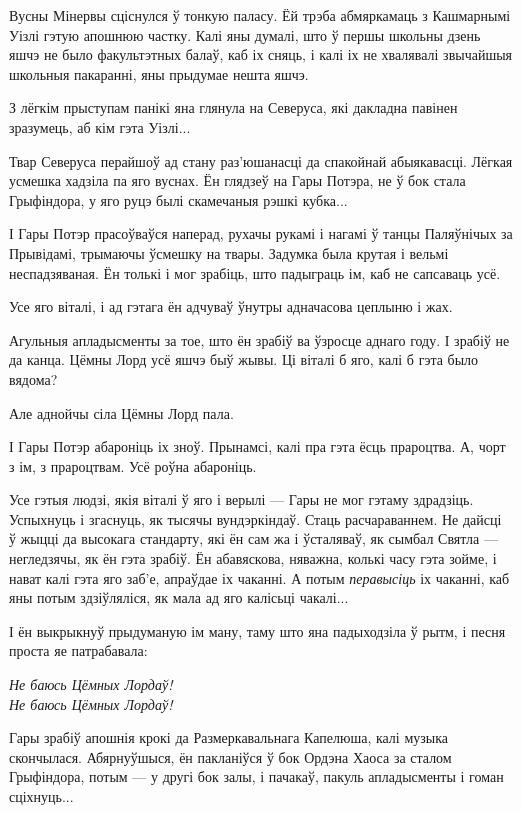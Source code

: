 Вусны Мінервы сціснулся ў тонкую паласу. Ёй трэба абмяркамаць з Кашмарнымі Уізлі
гэтую апошнюю частку. Калі яны думалі, што ў першы школьны дзень яшчэ не было 
факультэтных балаў, каб іх сняць, і калі іх не хвалявалі звычайшыя школьныя пакаранні,
яны прыдумае нешта яшчэ.

З лёгкім прыступам панікі яна глянула на Северуса, які дакладна павінен зразумець, аб кім гэта Уізлі...


Твар Северуса перайшоў ад стану раз'юшанасці да спакойнай абыякавасці. Лёгкая 
усмешка хадзіла па яго вуснах. Ён глядзеў на Гары Потэра, не ў бок стала Грыфіндора,
у яго руцэ былі скамечаныя рэшкі кубка...

І Гары Потэр прасоўваўся наперад, рухачы рукамі і нагамі ў танцы Паляўнічых за 
Прывідамі, трымаючы ўсмешку на твары. Задумка была крутая і вельмі неспадзяваная.
Ён толькі і мог зрабіць, што падыграць ім, каб не сапсаваць усё.

Усе яго віталі, і ад гэтага ён адчуваў ўнутры адначасова 
цеплыню і жах.

Агульныя апладысменты за тое, што ён зрабіў ва ўзросце аднаго году. І зрабіў не да канца.
Цёмны Лорд усё яшчэ быў жывы. Ці віталі б яго, калі б гэта было вядома?

Але аднойчы сіла Цёмны Лорд пала.

І Гары Потэр абароніць іх зноў. Прынамсі, калі пра гэта ёсць прароцтва. А, чорт з 
ім, з прароцтвам. Усё роўна абароніць.

Усе гэтыя людзі, якія віталі ў яго і верылі --- Гары не мог гэтаму здрадзіць.
Успыхнуць і згаснуць, як тысячы вундэркіндаў. Стаць расчараваннем. Не дайсці 
ў жыцці да высокага стандарту, які ён сам жа і ўсталяваў, як сымбал Святла ---
негледзячы, як ён гэта зрабіў. Ён абавяскова, няважна, колькі часу гэта зойме, 
і нават калі гэта яго заб'е, апраўдае іх чаканні. А потым \emph{перавысіць}
іх чаканні, каб яны потым здзіўляліся, як мала ад яго калісьці чакалі...

І ён выкрыкнуў прыдуманую ім ману, таму што яна падыходзіла ў рытм, і 
песня проста яе патрабавала:


\begin{center}
    \emph{Не баюсь Цёмных Лордаў!\\
Не баюсь Цёмных Лордаў!}
\end{center}

Гары зрабіў апошнія крокі да Размеркавальнага Капелюша, калі музыка скончылася.
Абярнуўшыся, ён пакланіўся ў бок
Ордэна Хаоса за сталом Грыфіндора, потым --- у другі бок залы, і 
пачакаў, пакуль апладысменты і гоман сціхнуць...


